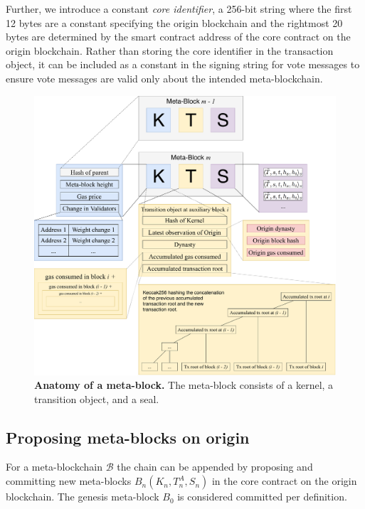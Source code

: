 \documentclass[12pt,a4paper]{article}
\begin{document}
Further, we introduce a constant \emph{core identifier}, a 256-bit string where the first 12 bytes are a constant specifying the origin blockchain and the rightmost 20 bytes are determined by the smart contract address of the core contract on the origin blockchain. Rather than storing the core identifier in the transaction object, it can be included as a constant in the signing string for vote messages to ensure vote messages are valid only about the intended meta-blockchain.


\begin{figure}
    \centering
	\includegraphics[width=\textwidth]{meta_block}
	\caption{\textbf{Anatomy of a meta-block.}
		The meta-block consists of a kernel, a transition object, and a seal.
	}
	\label{fig:meta_block}
\end{figure}

\subsection{Proposing meta-blocks on origin}

For a meta-blockchain $\mathcal{B}$ the chain can be appended by proposing and committing new meta-blocks $B_n(K_n, T^A_n, S_n)$ in the core contract on the origin block\-chain. The genesis meta-block $B_0$ is considered committed per definition.
\end{document}

